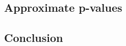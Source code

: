 \documentclass{article}
\begin{document}





\subsection{Approximate p-values}




\subsection{Conclusion}
\end{document}
